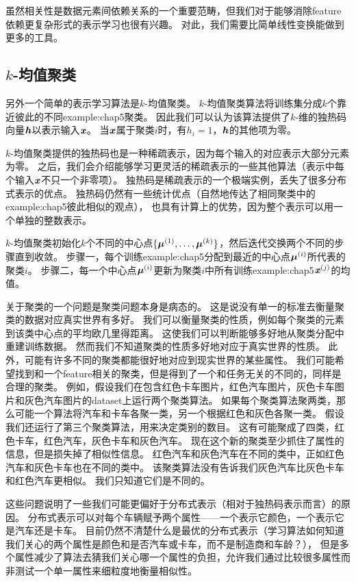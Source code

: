 虽然相关性是数据元素间依赖关系的一个重要范畴，但我们对于能够消除\gls{feature}依赖更复杂形式的表示学习也很有兴趣。
对此，我们需要比简单线性变换能做到更多的工具。

\subsection{$k$-均值聚类}
\label{sec:k_means_clustering}
另外一个简单的表示学习算法是$k$-均值聚类。
$k$-均值聚类算法将训练集分成$k$个靠近彼此的不同\gls{example:chap5}聚类。
因此我们可以认为该算法提供了$k$-维的独热码向量$\boldsymbol{\mathit{h}}$以表示输入$\boldsymbol{\mathit{x}}$。
当$\boldsymbol{\mathit{x}}$属于聚类$i$时，有$h_i=1$，$\boldsymbol{\mathit{h}}$的其他项为零。

$k$-均值聚类提供的独热码也是一种稀疏表示，因为每个输入的对应表示大部分元素为零。
之后，我们会介绍能够学习更灵活的稀疏表示的一些其他算法（表示中每个输入$\boldsymbol{\mathit{x}}$不只一个非零项）。
独热码是稀疏表示的一个极端实例，丢失了很多分布式表示的优点。
独热码仍然有一些统计优点（自然地传达了相同聚类中的\gls{example:chap5}彼此相似的观点），
也具有计算上的优势，因为整个表示可以用一个单独的整数表示。

$k$-均值聚类初始化$k$个不同的中心点$\{\boldsymbol{\mu}^{(1)},\dots,\boldsymbol{\mu}^{(k)}\}$，然后迭代交换两个不同的步骤直到收敛。
步骤一，每个训练\gls{example:chap5}分配到最近的中心点$\boldsymbol{\mu}^{(i)}$所代表的聚类$i$。
步骤二，每一个中心点$\boldsymbol{\mu}^{(i)}$更新为聚类$i$中所有训练\gls{example:chap5}$\boldsymbol{\mathit{x}}^{(j)}$的均值。

关于聚类的一个问题是聚类问题本身是病态的。
这是说没有单一的标准去衡量聚类的数据对应真实世界有多好。
我们可以衡量聚类的性质，例如每个聚类的元素到该类中心点的平均欧几里得距离。
这使我们可以判断能够多好地从聚类分配中重建训练数据。
然而我们不知道聚类的性质多好地对应于真实世界的性质。
此外，可能有许多不同的聚类都能很好地对应到现实世界的某些属性。
我们可能希望找到和一个\gls{feature}相关的聚类，但是得到了一个和任务无关的不同的，同样是合理的聚类。
例如，假设我们在包含红色卡车图片，红色汽车图片，灰色卡车图片和灰色汽车图片的\gls{dataset}上运行两个聚类算法。
如果每个聚类算法聚两类，那么可能一个算法将汽车和卡车各聚一类，另一个根据红色和灰色各聚一类。
假设我们还运行了第三个聚类算法，用来决定类别的数目。
这有可能聚成了四类，红色卡车，红色汽车，灰色卡车和灰色汽车。
现在这个新的聚类至少抓住了属性的信息，但是损失掉了相似性信息。
红色汽车和灰色汽车在不同的类中，正如红色汽车和灰色卡车也在不同的类中。
该聚类算法没有告诉我们灰色汽车比灰色卡车和红色汽车更相似。
我们只知道它们是不同的。


这些问题说明了一些我们可能更偏好于分布式表示（相对于独热码表示而言）的原因。
分布式表示可以对每个车辆赋予两个属性——一个表示它颜色，一个表示它是汽车还是卡车。
目前仍然不清楚什么是最优的分布式表示（学习算法如何知道我们关心的两个属性是颜色和是否汽车或卡车，而不是制造商和车龄？），
但是多个属性减少了算法去猜我们关心哪一个属性的负担，允许我们通过比较很多属性而非测试一个单一属性来细粒度地衡量相似性。

